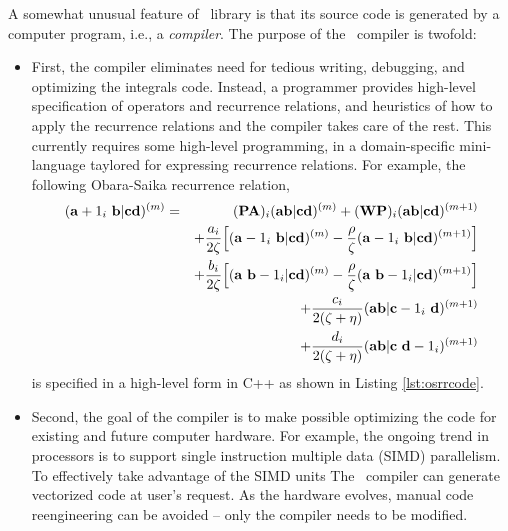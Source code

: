 \documentclass[10pt]{article}
\begin{document}
A somewhat unusual feature of \LIBINT\ library is that its source code is
generated by a computer program, i.e., a {\em compiler}. The purpose of the
\LIBINT\ compiler is twofold:
\begin{itemize}
\item First, the compiler eliminates need for tedious writing,
debugging, and optimizing the integrals code.
Instead, a programmer provides high-level specification of
operators and recurrence relations,
and heuristics of how to apply the recurrence relations and the compiler takes care of the rest.
This currently requires some high-level programming, in a domain-specific
mini-language taylored for expressing recurrence relations. For example, the
following Obara-Saika recurrence relation,\cite{Obara86}
\begin{eqnarray}
\label{eq:osvrrA}
({\bf a}+1_i\ {\bf b}| {\bf c} {\bf d})^{(m)} & = &
({\bf PA})_i ({\bf a} {\bf b}| {\bf c} {\bf d})^{(m)} +
({\bf WP})_i ({\bf a} {\bf b}| {\bf c} {\bf d})^{(m+1)} \nonumber \\
& & +
\frac{a_i}{2 \zeta} \Bigl[
({\bf a}-1_i\ {\bf b}| {\bf c} {\bf d})^{(m)} - \frac{\rho}{\zeta}
({\bf a}-1_i\ {\bf b}| {\bf c} {\bf d})^{(m+1)} \Bigr] \nonumber \\
& & +
\frac{b_i}{2 \zeta} \Bigl[
({\bf a}\ {\bf b}-1_i| {\bf c} {\bf d})^{(m)} - \frac{\rho}{\zeta}
({\bf a}\ {\bf b}-1_i| {\bf c} {\bf d})^{(m+1)} \Bigr] \nonumber \\
& & +
\frac{c_i}{2 (\zeta+\eta)}
({\bf a} {\bf b}| {\bf c}-1_i\ {\bf d})^{(m+1)} \nonumber \\
& & +
\frac{d_i}{2 (\zeta+\eta)}
({\bf a} {\bf b}| {\bf c}\ {\bf d}-1_i)^{(m+1)}
\end{eqnarray}
is specified in a high-level form in C++ as shown in Listing \ref{lst:osrrcode}.
\item Second, the goal of the compiler is to make possible optimizing the code
for existing and future computer hardware. For example, the ongoing trend in
processors is to support single instruction multiple data (SIMD)
parallelism. To effectively take advantage of the SIMD units
The \LIBINT\ compiler can generate vectorized code at user's request.
As the hardware evolves, manual code reengineering can be avoided --
only the compiler needs to be modified.
\end{itemize}
\end{document}
